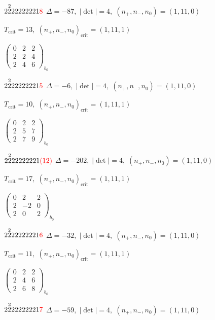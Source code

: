 \documentclass[10pt]{article}
\begin{document}
$2\overset{2}{2}22222221\textcolor{red}{8}$ \quad $\Delta=-87,\; |\det|=4,\; (n_+,n_-,n_0)=(1,11,0)$

\hspace{1em}$T_{\text{crit}}=13,\; (n_+,n_-,n_0)_{\text{crit}}=(1,11,1)$

\hspace{2em}$\left(\begin{smallmatrix}0 & 2 & 2 \\ 2 & 2 & 4 \\ 2 & 4 & 6\end{smallmatrix}\right)_{\!b_0}$

$2\overset{2}{2}22222221\textcolor{red}{5}$ \quad $\Delta=-6,\; |\det|=4,\; (n_+,n_-,n_0)=(1,11,0)$

\hspace{1em}$T_{\text{crit}}=10,\; (n_+,n_-,n_0)_{\text{crit}}=(1,11,1)$

\hspace{2em}$\left(\begin{smallmatrix}0 & 2 & 2 \\ 2 & 5 & 7 \\ 2 & 7 & 9\end{smallmatrix}\right)_{\!b_0}$

$2\overset{2}{2}22222221\textcolor{red}{(12)}$ \quad $\Delta=-202,\; |\det|=4,\; (n_+,n_-,n_0)=(1,11,0)$

\hspace{1em}$T_{\text{crit}}=17,\; (n_+,n_-,n_0)_{\text{crit}}=(1,11,1)$

\hspace{2em}$\left(\begin{smallmatrix}0 & 2 & 2 \\ 2 & -2 & 0 \\ 2 & 0 & 2\end{smallmatrix}\right)_{\!b_0}$

$2\overset{2}{2}22222221\textcolor{red}{6}$ \quad $\Delta=-32,\; |\det|=4,\; (n_+,n_-,n_0)=(1,11,0)$

\hspace{1em}$T_{\text{crit}}=11,\; (n_+,n_-,n_0)_{\text{crit}}=(1,11,1)$

\hspace{2em}$\left(\begin{smallmatrix}0 & 2 & 2 \\ 2 & 4 & 6 \\ 2 & 6 & 8\end{smallmatrix}\right)_{\!b_0}$

$2\overset{2}{2}22222221\textcolor{red}{7}$ \quad $\Delta=-59,\; |\det|=4,\; (n_+,n_-,n_0)=(1,11,0)$
\end{document}
